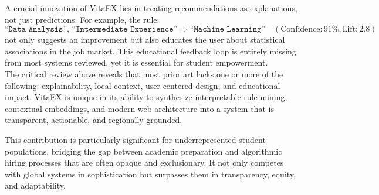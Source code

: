 \documentclass[runningheads]{llncs}
\begin{document}
	A crucial innovation of VitaEX lies in treating recommendations as explanations, not just predictions. For example, the rule:
	\[
	\texttt{``Data Analysis'', ``Intermediate Experience''} \Rightarrow \texttt{``Machine Learning''} \quad (\text{Confidence}: 91\%, \text{Lift}: 2.8)
	\]
	not only suggests an improvement but also educates the user about statistical associations in the job market. This educational feedback loop is entirely missing from most systems reviewed, yet it is essential for student empowerment.\\
	
	
	The critical review above reveals that most prior art lacks one or more of the following: explainability, local context, user-centered design, and educational impact. VitaEX is unique in its ability to synthesize interpretable rule-mining, contextual embeddings, and modern web architecture into a system that is transparent, actionable, and regionally grounded.
	
	This contribution is particularly significant for underrepresented student populations, bridging the gap between academic preparation and algorithmic hiring processes that are often opaque and exclusionary. It not only competes with global systems in sophistication but surpasses them in transparency, equity, and adaptability.
	
\end{document}

